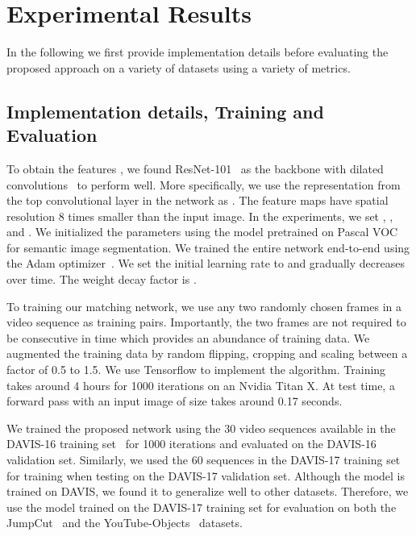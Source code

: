 

\section{Experimental Results}
In the following we first provide implementation details before evaluating the proposed approach on a variety of datasets using a variety of metrics.

\subsection{Implementation details, Training and Evaluation}

To obtain the features , we found ResNet-101~\cite{HeCVPR16} as the backbone with dilated convolutions~\cite{ChenArxiv16} to perform well. More specifically, we use the representation from the top convolutional layer in the network as . The feature maps have spatial resolution 8 times smaller than the input image. In the experiments, we set , ,  and . We initialized the parameters using the model pretrained on Pascal VOC~\cite{EveringhamIJCV15,HariharanICCV11} for semantic image segmentation. We trained the entire network end-to-end using the Adam optimizer~\cite{kingma2014adam}. We set the initial learning rate to  and gradually decreases over time. The weight decay factor is .

To training our matching network, we use any two randomly chosen frames in a video sequence as training pairs. Importantly, the two frames are not required to be consecutive in time which provides an abundance of training data. We augmented the training data by random flipping, cropping and scaling between a factor of 0.5 to 1.5. We use Tensorflow to implement the algorithm.  Training takes around 4 hours for 1000 iterations  on an Nvidia Titan X. At test time, a forward pass with an input image of size  takes around 0.17 seconds. 




 We trained the proposed network using the 30 video sequences available in the DAVIS-16 training set~\cite{PerazziCVPR16} for 1000 iterations and evaluated on the DAVIS-16 validation set. Similarly, we used the 60 sequences in the DAVIS-17 training set~\cite{pont2017DAVIS} for training when testing on the DAVIS-17 validation set. Although the model is trained on DAVIS, we found it to generalize well to other datasets. Therefore, we use the model trained on the DAVIS-17 training set for evaluation on both the JumpCut~\cite{FanTOG15} and the YouTube-Objects~\cite{PrestCVPR12} datasets. 

